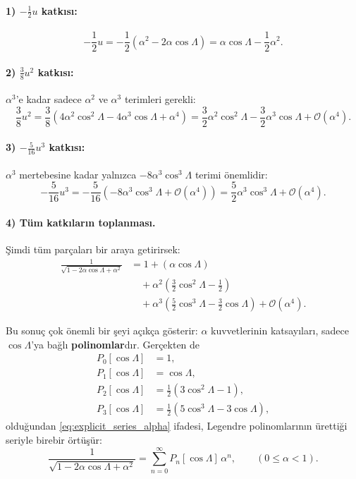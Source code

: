 \paragraph{1) $-\tfrac12 u$ katkısı:}
\begin{equation}
-\frac12 u
=
-\frac12(\alpha^2-2\alpha\cos\Lambda)
=
\alpha\cos\Lambda-\frac12\alpha^2.
\end{equation}

\paragraph{2) $\tfrac{3}{8}u^2$ katkısı:}
$\alpha^3$’e kadar sadece $\alpha^2$ ve $\alpha^3$ terimleri gerekli:
\begin{equation}
\frac{3}{8}u^2
=
\frac{3}{8}\left(4\alpha^2\cos^2\Lambda -4\alpha^3\cos\Lambda + \alpha^4\right)
=
\frac{3}{2}\alpha^2\cos^2\Lambda
-\frac{3}{2}\alpha^3\cos\Lambda
+\mathcal{O}(\alpha^4).
\end{equation}

\paragraph{3) $-\tfrac{5}{16}u^3$ katkısı:}
$\alpha^3$ mertebesine kadar yalnızca $-8\alpha^3\cos^3\Lambda$ terimi önemlidir:
\begin{equation}
-\frac{5}{16}u^3
=
-\frac{5}{16}\left(-8\alpha^3\cos^3\Lambda+\mathcal{O}(\alpha^4)\right)
=
\frac{5}{2}\alpha^3\cos^3\Lambda
+\mathcal{O}(\alpha^4).
\end{equation}

\paragraph{4) Tüm katkıların toplanması.}
Şimdi tüm parçaları bir araya getirirsek:
\begin{align}
\frac{1}{\sqrt{1-2\alpha\cos\Lambda+\alpha^2}}
&=
1
+\left(\alpha\cos\Lambda\right) \nonumber\\
&\quad
+\alpha^2\left(\frac{3}{2}\cos^2\Lambda-\frac{1}{2}\right)\nonumber\\
&\quad
+\alpha^3\left(\frac{5}{2}\cos^3\Lambda-\frac{3}{2}\cos\Lambda\right)
+\mathcal{O}(\alpha^4).
\label{eq:explicit_series_alpha}
\end{align}

Bu sonuç çok önemli bir şeyi açıkça gösterir:
$\alpha$ kuvvetlerinin katsayıları,
sadece $\cos\Lambda$'ya bağlı \textbf{polinomlar}dır.
Gerçekten de
\begin{align}
P_0[\cos\Lambda]&=1,\\
P_1[\cos\Lambda]&=\cos\Lambda,\\
P_2[\cos\Lambda]&=\frac12\left(3\cos^2\Lambda-1\right),\\
P_3[\cos\Lambda]&=\frac12\left(5\cos^3\Lambda-3\cos\Lambda\right),
\end{align}
olduğundan \eqref{eq:explicit_series_alpha} ifadesi,
Legendre polinomlarının ürettiği seriyle birebir örtüşür:
\begin{equation}
\frac{1}{\sqrt{1-2\alpha\cos\Lambda+\alpha^2}}
=
\sum_{n=0}^{\infty}P_n[\cos\Lambda]\,\alpha^n,
\qquad (0\le \alpha<1).
\end{equation}


